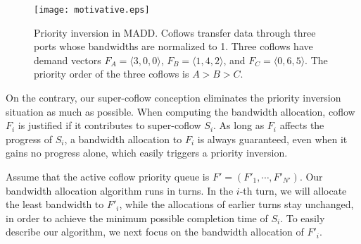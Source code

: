 \documentclass[10pt,journal,compsoc]{IEEEtran}
\begin{document}
\begin{figure}[!t]
	\centering\texttt{[image: motivative.eps]}
	\caption{Priority inversion in MADD. Coflows transfer data through three ports whose bandwidths are normalized to 1. Three coflows have demand vectors $F_A=\langle 3,0,0\rangle$, $F_B=\langle 1,4,2\rangle$, and $F_C=\langle 0,6,5\rangle$. The priority order of the three coflows is $A > B > C$.}\label{motivative}
\end{figure}


On the contrary, our super-coflow conception eliminates the priority inversion situation as much as possible.
%
When computing the bandwidth allocation, coflow $F_i$ is justified if it contributes to super-coflow $S_i$.
%
As long as $F_i$ affects the progress of $S_i$, a bandwidth allocation to $F_i$ is always guaranteed, even when it gains no progress alone, which easily triggers a priority inversion.

Assume that the active coflow priority queue is $F'=(F'_1,\cdots,F'_{N'})$.
%
Our bandwidth allocation algorithm runs in turns.
%
In the $i$-th turn, we will allocate the least bandwidth to $F'_i$, while the allocations of earlier turns stay unchanged, in order to achieve the minimum possible completion time of $S_i$.
%
To easily describe our algorithm, we next focus on the bandwidth allocation of $F'_i$.
\end{document}

